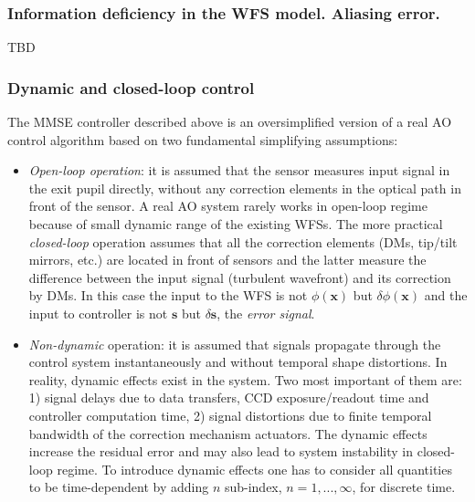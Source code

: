 \subsubsection{Information deficiency in the WFS model. Aliasing error.}

TBD

\subsubsection{Dynamic and closed-loop control}

The MMSE controller described above is an oversimplified version of a real AO
control algorithm based on two fundamental simplifying assumptions:
\begin{itemize}
	\item \emph{Open-loop operation}:  it is assumed
	that the sensor measures input signal in the exit pupil directly,
	without any correction elements in the optical path in front of the sensor.
	A real AO system rarely works in open-loop regime because of small dynamic
	range of the existing WFSs. The more practical \emph{closed-loop} operation
	assumes that all the correction elements (DMs, tip/tilt mirrors, etc.) are
	located in front of sensors and the latter measure the difference between
	the input signal (turbulent wavefront) and its correction by DMs. In this
	case the input to the WFS is not
	$\phi(\bm{x})$ but $\delta \phi(\bm{x})$ and the input to
	controller is not $\bm{s}$ but $\delta \bm{s}$, the \emph{error signal}.
  \item \emph{Non-dynamic} operation:  it is
  assumed that signals propagate through the control system instantaneously
  and without temporal shape distortions. In reality, dynamic effects exist in
  the system. Two most important of them are: 1) signal delays due to
  data transfers, CCD exposure/readout time and controller computation time,
  2) signal distortions due to finite temporal bandwidth of the correction
  mechanism actuators. The dynamic effects increase the residual error and may
  also lead to system instability in closed-loop regime. To introduce dynamic
  effects one has to consider all quantities to be time-dependent by adding
  $n$ sub-index, $n=1,...,\infty$, for discrete time.
\end{itemize}

